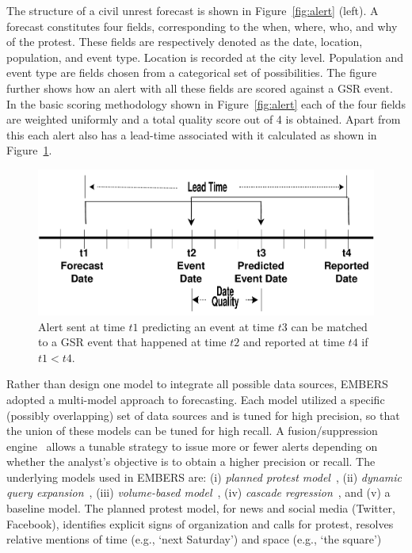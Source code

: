 The structure of a civil unrest forecast is shown in
Figure~\ref{fig:alert} (left).
A forecast constitutes four fields, corresponding to the when, where, who, and why
of the protest. These fields are respectively denoted as the date, location, population, and event type.
Location is recorded at the city level. Population and event type are fields chosen from a categorical
set of possibilities.  The figure further shows how an alert with all
these fields are scored against a GSR event. In the basic scoring
methodology shown in Figure~\ref{fig:alert} each of the four fields
are weighted uniformly and a total quality score out of 4 is
obtained.  Apart from this each alert also has a lead-time associated with
it calculated as shown in Figure~\ref{fig:leadtime}.
\begin{figure}
\includegraphics[width=\columnwidth]{figures/cu/timeline.pdf}
\caption{Alert sent at time $t1$ predicting an event at time $t3$
can be matched to a GSR event that happened at time $t2$ and reported
at time $t4$ if $t1 < t4$.}
\label{fig:leadtime}
\end{figure}
Rather than design one model to integrate all possible data sources, EMBERS adopted a multi-model
approach to forecasting. Each model utilized a specific (possibly overlapping) set of data sources
and is tuned for high precision, so that the union of these models can be tuned for high recall.
A fusion/suppression engine~\cite{andy-scotland-paper} allows a tunable
strategy to issue more or fewer
alerts depending on whether the analyst's objective is to obtain a higher
precision or recall. The underlying models used in EMBERS are: (i)
\textit{planned protest model}~\cite{pp-paper1},
(ii) \textit{dynamic query expansion}~\cite{dqe-plosone}, (iii) \textit{volume-based model}~\cite{asonam},
(iv) \textit{cascade regression}~\cite{anil-plosone}, and (v) a baseline model. The planned protest model,
for news and social media (Twitter, Facebook), identifies explicit signs of organization and calls
for protest, resolves relative mentions of time (e.g., `next Saturday') and space (e.g., `the square')
